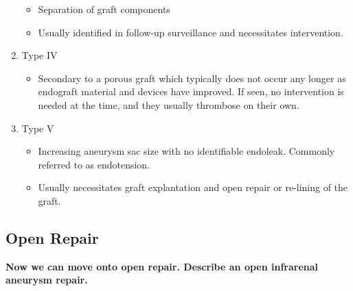 \documentclass[
]{book}
\providecommand{\tightlist}{%
  \setlength{\itemsep}{0pt}\setlength{\parskip}{0pt}}
\begin{document}
\begin{enumerate}
  \begin{itemize}
  \item
    Separation of graft components
  \item
    Usually identified in follow-up surveillance and necessitates
    intervention.
  \end{itemize}
\item
  Type IV

  \begin{itemize}
  \tightlist
  \item
    Secondary to a porous graft which typically does not occur any
    longer as endograft material and devices have improved. If seen,
    no intervention is needed at the time, and they usually
    thrombose on their own.
  \end{itemize}
\item
  Type V

  \begin{itemize}
  \item
    Increasing aneurysm sac size with no identifiable endoleak.
    Commonly referred to as endotension.
  \item
    Usually necessitates graft explantation and open repair or
    re-lining of the graft.
  \end{itemize}
\end{enumerate}

\hypertarget{open-repair}{%
\subsection{Open Repair}\label{open-repair}}

\textbf{Now we can move onto open repair. Describe an open infrarenal aneurysm
repair.} \citep{mooreVascularEndovascularSurgery2019, garygwindAnatomicExposuresVascular2013}
\end{document}
